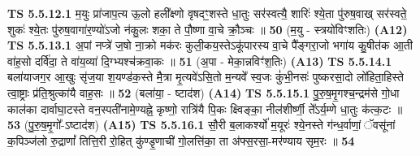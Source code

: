 \documentclass[17pt]{extarticle}
\begin{document}
                                        \textbf{ TS 5.5.12.1} \newline
                  म॒युः प्रा॑जाप॒त्य ऊ॒लो हली᳚क्ष्णो वृषदꣳ॒॒शस्ते धा॒तुः सर॑स्वत्यै॒ शारिः॑ श्ये॒ता पु॑रुष॒वाख् सर॑स्वते॒ शुकः॑ श्ये॒तः पु॑रुष॒वागा॑र॒ण्यो॑ऽजो न॑कु॒लः शका॒ ते पौ॒ष्णा वा॒चे क्रौ॒ञ्चः ॥ \textbf{  50} \newline
                  \newline
                      (म॒यु - स्त्रयो॑विꣳशतिः)  \textbf{(A12)} \newline \newline
                                        \textbf{ TS 5.5.13.1} \newline
                  अ॒पां नप्त्रे॑ ज॒षो ना॒क्रो मक॑रः कुली॒कय॒स्तेऽकू॑पारस्य वा॒चे पै᳚ङ्गरा॒जो भगा॑य कु॒षीत॑क आ॒ती वा॑ह॒सो दर्वि॑दा॒ ते वा॑य॒व्या॑ दि॒ग्भ्यश्च॑क्रवा॒कः ॥ \textbf{  51} \newline
                  \newline
                      (अ॒पा - मेका॒न्नविꣳ॑श॒तिः)  \textbf{(A13)} \newline \newline
                                        \textbf{ TS 5.5.14.1} \newline
                  बला॑याजग॒र आ॒खुः सृ॑ज॒या श॒यण्ड॑क॒स्ते मै॒त्रा मृ॒त्यवे॑ऽसि॒तो म॒न्यवे᳚ स्व॒जः कुं॑भी॒नसः॑ पुष्करसा॒दो लो॑हिता॒हिस्ते त्वा॒ष्ट्राः प्र॑ति॒श्रुत्का॑यै वाह॒सः ॥ \textbf{  52 } \newline
                  \newline
                      (बला॑या॒ - ष्टाद॑श)  \textbf{(A14)} \newline \newline
                                        \textbf{ TS 5.5.15.1} \newline
                  पु॒रु॒ष॒मृ॒गश्च॒न्द्रम॑से गो॒धा काल॑का दार्वाघा॒टस्ते वन॒स्पती॑नामे॒ण्यह्ने॒ कृष्णो॒ रात्रि॑यै पि॒कः क्ष्विङ्का॒ नील॑शीर्ष्णी॒ ते᳚ऽर्य॒म्णे धा॒तुः क॑त्क॒टः ॥ \textbf{  53} \newline
                  \newline
                      (पु॒रु॒ष॒मृ॒गो᳚-ऽष्टाद॑श)  \textbf{(A15)} \newline \newline
                                        \textbf{ TS 5.5.16.1} \newline
                  सौ॒री ब॒लाकर्श्यो॑ म॒यूरः॑ श्ये॒नस्ते ग॑न्ध॒र्वाणां॒ ॅवसू॑नां क॒पिञ्ज॑लो रु॒द्राणां᳚ तित्ति॒री रो॒हित् कु॑ण्डृ॒णाची॑ गो॒लत्ति॑का॒ ता अ॑फ्स॒रसा॒-मर॑ण्याय सृम॒रः ॥ \textbf{  54 } \newline
\end{document}
